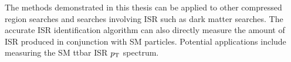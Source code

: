 


\indent The methods demonstrated in this thesis can be applied to other compressed region searches and searches involving ISR such as dark matter searches.  The accurate ISR identification algorithm can also directly measure the amount of ISR produced in conjunction with SM particles. Potential applications include measuring the SM ttbar ISR $p_{\mathrm{T}}$ spectrum. \\

